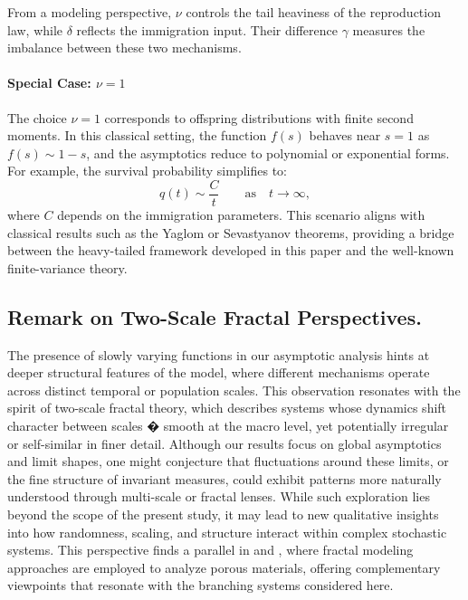 \documentclass[10pt,reqno]{amsart}
\theoremstyle{definition}
\numberwithin{equation}{section}
\begin{document}
    From a modeling perspective, \(\nu\) controls the tail heaviness of the reproduction law, while \(\delta\) reflects
    the immigration input. Their difference \(\gamma\) measures the imbalance between these two mechanisms.

\paragraph{Special Case: \(\nu=1\)}
    The choice \(\nu = 1\) corresponds to offspring distributions with finite second moments. In this classical setting,
    the function \(f(s)\) behaves near \(s = 1\) as \(f(s) \sim 1 - s\), and the asymptotics reduce to polynomial or
    exponential forms. For example, the survival probability simplifies to:
\[
    q(t) \sim \dfrac{C}{t} \qquad \text{as} \quad {t\to\infty},
\]
    where \(C\) depends on the immigration parameters. This scenario aligns with classical results such as the
    Yaglom or Sevastyanov theorems, providing a bridge between the heavy-tailed framework developed in this
    paper and the well-known finite-variance theory.


\subsection{Remark on Two-Scale Fractal Perspectives.}

    The presence of slowly varying functions in our asymptotic analysis hints at deeper structural features of
    the model, where different mechanisms operate across distinct temporal or population scales. This observation
    resonates with the spirit of two-scale fractal theory, which describes systems whose dynamics shift character
    between scales � smooth at the macro level, yet potentially irregular or self-similar in finer detail. Although
    our results focus on global asymptotics and limit shapes, one might conjecture that fluctuations around these
    limits, or the fine structure of invariant measures, could exhibit patterns more naturally understood through
    multi-scale or fractal lenses. While such exploration lies beyond the scope of the present study, it may lead
    to new qualitative insights into how randomness, scaling, and structure interact within complex stochastic systems.
    This perspective finds a parallel in {\cite{He2Liu24}} and {\cite{HeLiu24}}, where fractal modeling approaches
    are employed to analyze porous materials, offering complementary viewpoints that resonate with the branching
    systems considered here.
\end{document}
